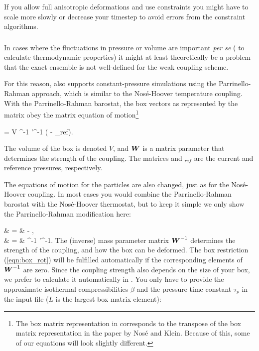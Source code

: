 If you allow full anisotropic deformations and use constraints
you might have to scale more slowly or decrease your timestep to avoid 
errors from the constraint algorithms. 


\subsubsection{}

In cases where the fluctuations in pressure or volume 
are important {\em per se} ({\eg} to calculate thermodynamic
properties) it might at least theoretically be a problem that the 
exact ensemble is not well-defined for the weak coupling scheme. 

For this reason, {\gromacs} also supports constant-pressure simulations using 
the Parrinello-Rahman approach\cite{Parrinello81,Nose83}, which is similar
to the Nos\'e-Hoover temperature coupling. With the Parrinello-Rahman 
barostat, the box vectors as represented by the matrix  obey
the matrix equation of motion\footnote{The box matrix representation  in 
{\gromacs} corresponds to the transpose of the box matrix representation 
 in the paper by Nos\'e and Klein. Because of this, some of our 
equations will look slightly different.}

\beq
{}= V ^{-1} '^{-1} \left(  - _{ref}\right).
\eeq

The volume of the box is denoted $V$, and $\mbox{\boldmath ${W}$}$ is a matrix parameter that determines
the strength of the coupling. The matrices  and $_{ref}$ are the 
current and reference pressures, respectively.

The equations of motion for the particles are also changed, just as
for the Nos\'e-Hoover coupling. In most cases you would combine the 
Parrinello-Rahman barostat with the Nos\'e-Hoover
thermostat, but to keep it simple we only show the Parrinello-Rahman 
modification here:

\bea
{} & = &  - 
  , \\
 & = & ^{-1}  '^{-1}.
\eea
The (inverse) mass parameter matrix $\mbox{\boldmath ${W}$}^{-1}$ determines the
strength of the coupling, and how the box can be deformed.
The box restriction (\ref{eqn:box_rot}) will be fulfilled automatically
if the corresponding elements of $\mbox{\boldmath ${W}$}^{-1}$ are zero. Since the
coupling strength also depends on the size of your box, we prefer
to calculate it automatically in {\gromacs}. 
You only have to provide the approximate
isothermal compressibilities {\boldmath $\beta$} 
and the pressure time constant $\tau_p$ in the input file
($L$ is the largest box matrix element):

